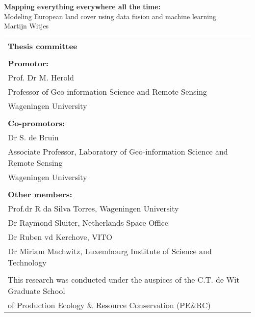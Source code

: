 \thispagestyle{empty}
\begin{center}
\Huge{\textbf{Mapping everything everywhere all the time:}} \\
\Huge{Modeling European land cover using data fusion and machine learning} \\
\vspace*{1cm}
\vspace*{1cm}
\vspace*{\fill}
\large{Martijn Witjes}\\
\end{center}

\newpage
\thispagestyle{empty}
\vspace*{\fill}
\begin{tabular}{l}
    \textbf{Thesis committee}                                                                 \\  
                                                                                              \\  
    \textbf{Promotor:} \\  
    Prof. Dr M. Herold  \\  
    Professor of Geo-information Science and Remote Sensing\\  
    Wageningen University \\
    \\  
    \textbf{Co-promotors:}\\  
    Dr S. de Bruin \\  
    Associate Professor, Laboratory of Geo-information Science and Remote Sensing \\  
    Wageningen University \\  
    \\  

    \textbf{Other members:}                                                                   \\  
    Prof.dr R da Silva Torres, Wageningen University \\  
    Dr Raymond Sluiter, Netherlands Space Office \\  
    Dr Ruben vd Kerchove, VITO \\  
    Dr Miriam Machwitz, Luxembourg Institute of Science and Technology \\  \\  
    \small{This research was conducted under the auspices of the C.T. de Wit Graduate School} \\  
    \small{of Production Ecology \& Resource Conservation (PE$\&$RC)}                         \\  
\end{tabular}

